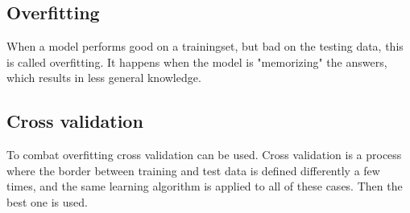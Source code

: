 \subsection{Overfitting}
\label{sec:overfit}
When a model performs good on a trainingset, but bad on the testing data, this is called overfitting. It happens when the model is "memorizing" the answers, which results in less general knowledge.

\subsection{Cross validation}
To combat overfitting cross validation can be used. Cross validation is a process where the border between training and test data is defined differently a few times, and the same learning algorithm is applied to all of these cases. Then the best one is used.